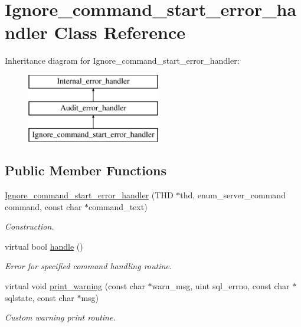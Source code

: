 \hypertarget{classIgnore__command__start__error__handler}{}\section{Ignore\+\_\+command\+\_\+start\+\_\+error\+\_\+handler Class Reference}
\label{classIgnore__command__start__error__handler}
Inheritance diagram for Ignore\+\_\+command\+\_\+start\+\_\+error\+\_\+handler\+:\begin{figure}[H]
\begin{center}
\leavevmode
\includegraphics[height=3.000000cm]{classIgnore__command__start__error__handler}
\end{center}
\end{figure}
\subsection*{Public Member Functions}
\begin{DoxyCompactItemize}
\item 
\mbox{\hyperlink{classIgnore__command__start__error__handler_a1a819f9bc574bb3d9e4f61c28af67582}{Ignore\+\_\+command\+\_\+start\+\_\+error\+\_\+handler}} (T\+HD $\ast$thd, enum\+\_\+server\+\_\+command command, const char $\ast$command\+\_\+text)
\begin{DoxyCompactList}\small\item\em Construction. \end{DoxyCompactList}\item 
virtual bool \mbox{\hyperlink{classIgnore__command__start__error__handler_a237add9c946d5b5f76c40483bde4a4b7}{handle}} ()
\begin{DoxyCompactList}\small\item\em Error for specified command handling routine. \end{DoxyCompactList}\item 
virtual void \mbox{\hyperlink{classIgnore__command__start__error__handler_a182e2ebd517169e1138bbbf3999896ac}{print\+\_\+warning}} (const char $\ast$warn\+\_\+msg, uint sql\+\_\+errno, const char $\ast$sqlstate, const char $\ast$msg)
\begin{DoxyCompactList}\small\item\em Custom warning print routine. \end{DoxyCompactList}\end{DoxyCompactItemize}
